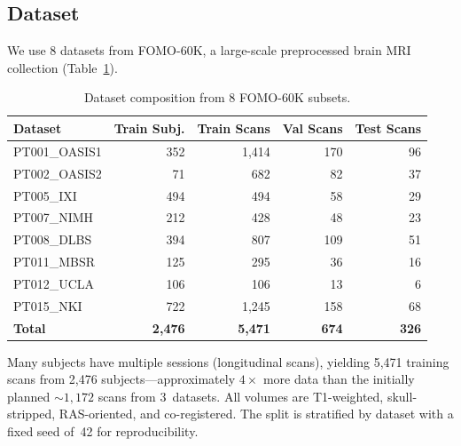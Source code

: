\subsection{Dataset}

We use 8 datasets from FOMO-60K, a large-scale preprocessed brain MRI
collection (Table~\ref{tab:dataset}).

\begin{table}[ht]
\centering
\caption{Dataset composition from 8 FOMO-60K subsets.}
\label{tab:dataset}
\begin{tabular}{lrrrr}
\toprule
\textbf{Dataset} & \textbf{Train Subj.} & \textbf{Train Scans} & \textbf{Val Scans} & \textbf{Test Scans} \\
\midrule
PT001\_OASIS1 & 352  & 1,414 & 170 & 96 \\
PT002\_OASIS2 & 71   & 682   & 82  & 37 \\
PT005\_IXI    & 494  & 494   & 58  & 29 \\
PT007\_NIMH   & 212  & 428   & 48  & 23 \\
PT008\_DLBS   & 394  & 807   & 109 & 51 \\
PT011\_MBSR   & 125  & 295   & 36  & 16 \\
PT012\_UCLA   & 106  & 106   & 13  & 6  \\
PT015\_NKI    & 722  & 1,245 & 158 & 68 \\
\midrule
\textbf{Total} & \textbf{2,476} & \textbf{5,471} & \textbf{674} & \textbf{326} \\
\bottomrule
\end{tabular}
\end{table}

Many subjects have multiple sessions (longitudinal scans), yielding 5,471
training scans from 2,476 subjects---approximately $4\times$ more data than
the initially planned ${\sim}1{,}172$ scans from 3~datasets.  All volumes are
T1-weighted, skull-stripped, RAS-oriented, and co-registered.  The split is
stratified by dataset with a fixed seed of~42 for reproducibility.
